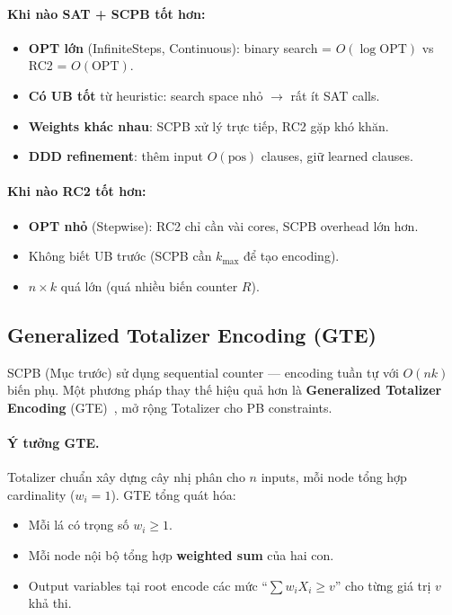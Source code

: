 \documentclass[11pt,a4paper]{article}
\begin{document}
\paragraph{Khi nào SAT + SCPB tốt hơn:}
\begin{itemize}
  \item \textbf{OPT lớn} (InfiniteSteps, Continuous): binary search = $O(\log \text{OPT})$ vs RC2 = $O(\text{OPT})$.
  \item \textbf{Có UB tốt} từ heuristic: search space nhỏ $\to$ rất ít SAT calls.
  \item \textbf{Weights khác nhau}: SCPB xử lý trực tiếp, RC2 gặp khó khăn.
  \item \textbf{DDD refinement}: thêm input $O(\text{pos})$ clauses, giữ learned clauses.
\end{itemize}

\paragraph{Khi nào RC2 tốt hơn:}
\begin{itemize}
  \item \textbf{OPT nhỏ} (Stepwise): RC2 chỉ cần vài cores, SCPB overhead lớn hơn.
  \item Không biết UB trước (SCPB cần $k_{\max}$ để tạo encoding).
  \item $n \times k$ quá lớn (quá nhiều biến counter $R$).
\end{itemize}

\subsection{Generalized Totalizer Encoding (GTE)}
\label{sec:gte}

SCPB (Mục trước) sử dụng sequential counter --- encoding tuần tự với $O(nk)$ biến phụ. Một phương pháp thay thế hiệu quả hơn là \textbf{Generalized Totalizer Encoding} (GTE)~\cite{joshi2015gte}, mở rộng Totalizer cho PB constraints.

\paragraph{Ý tưởng GTE.}
Totalizer chuẩn xây dựng cây nhị phân cho $n$ inputs, mỗi node tổng hợp cardinality ($w_i = 1$). GTE tổng quát hóa:
\begin{itemize}
  \item Mỗi lá có trọng số $w_i \geq 1$.
  \item Mỗi node nội bộ tổng hợp \textbf{weighted sum} của hai con.
  \item Output variables tại root encode các mức ``$\sum w_i X_i \geq v$'' cho từng giá trị $v$ khả thi.
\end{itemize}
\end{document}
